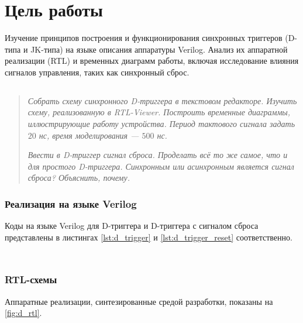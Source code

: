 
\section*{Цель работы}
Изучение принципов построения и функционирования синхронных триггеров (D-типа и JK-типа) на языке описания аппаратуры Verilog. Анализ их аппаратной реализации (RTL) и временных диаграмм работы, включая исследование влияния сигналов управления, таких как синхронный сброс.

\subsection*{  }
\begin{quote}
    \textit{Собрать схему синхронного D-триггера в текстовом редакторе. Изучить схему, реализованную в RTL-Viewer. Построить временные диаграммы, иллюстрирующие работу устройства. Период тактового сигнала задать $20$ нс, время моделирования --- $500$ нс. }

    \textit{Ввести в D-триггер сигнал сброса. Проделать всё то же самое, что и для простого D-триггера. Синхронным или асинхронным является сигнал сброса? Объяснить, почему.}
\end{quote}
 
\subsubsection*{Реализация на языке Verilog}
Коды на языке Verilog для D-триггера и D-триггера с сигналом сброса представлены в листингах \cref{lst:d_trigger} и \cref{lst:d_trigger_reset} соответственно.

\begin{listing}[H]
    \caption{Verilog-описание D-триггера (d.v)}
    \label{lst:d_trigger}
    \inputminted[]{verilog}{scripts/d.v}
\end{listing}

\begin{listing}[H]
    \caption{Verilog-описание D-триггера с сигналом сброса (d+r.v)}
    \label{lst:d_trigger_reset}
    \inputminted[]{verilog}{scripts/d+r.v}
\end{listing}

\subsubsection*{RTL-схемы}
Аппаратные реализации, синтезированные средой разработки, показаны на \cref{fig:d_rtl}.


